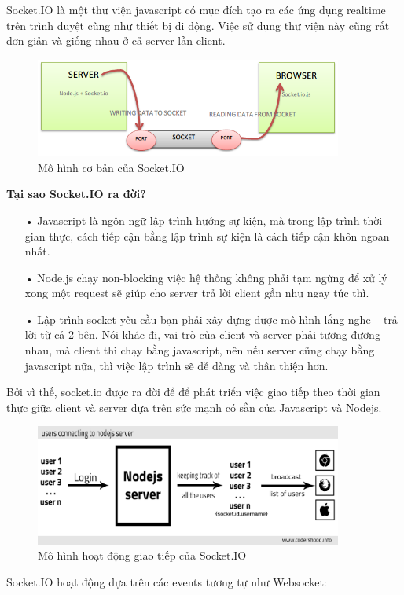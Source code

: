 Socket.IO là một thư viện javascript có mục đích tạo ra các ứng dụng realtime trên trình duyệt cũng như thiết bị di động. Việc sử dụng thư viện này cũng rất đơn giản và giống nhau ở cả server lẫn client. 
\begin{figure}[H]
	\centering    
	\includegraphics[width=0.9\textwidth]{socketio}
	\caption[Mô hình cơ bản của Socket.IO]{Mô hình cơ bản của Socket.IO}
	\label{fig: socketio}
\end{figure}
\textbf{Tại sao Socket.IO ra đời?}

\begin{itemize}
\item[•]Javascript là ngôn ngữ lập trình hướng sự kiện, mà trong lập trình thời gian thực, cách tiếp cận bằng lập trình sự kiện là cách tiếp cận khôn ngoan nhất.
\item[•]Node.js chạy non-blocking việc hệ thống không phải tạm ngừng để xử lý xong một request sẽ giúp cho server trả lời client gần như ngay tức thì.
\item[•]Lập trình socket yêu cầu bạn phải xây dựng được mô hình lắng nghe – trả lời từ cả 2 bên. Nói khác đi, vai trò của client và server phải tương đương nhau, mà client thì chạy bằng javascript, nên nếu server cũng chạy bằng javascript nữa, thì việc lập trình sẽ dễ dàng và thân thiện hơn.
\end{itemize}
Bởi vì thế, socket.io được ra đời để để phát triển việc giao tiếp theo thời gian thực giữa client và server dựa trên sức mạnh có sẵn của Javascript và Nodejs.
\begin{figure}[H]
	\centering    
	\includegraphics[width=0.9\textwidth]{socketio2}
	\caption[Mô hình hoạt động giao tiếp của Socket.IO]{Mô hình hoạt động giao tiếp của Socket.IO}
	\label{fig: socketio2}
\end{figure}
Socket.IO hoạt động dựa trên các events tương tự như Websocket:

